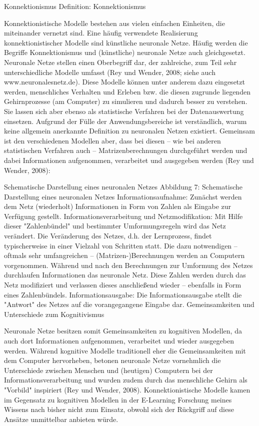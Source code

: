 \documentclass[a4paper, 12pt, twoside, BCOR=20mm, DIV=calc, abstracton, parskip=half*, toc=bibliography, toc=listof, headsepline, footsepline, headings=small, numbers=enddot]{scrreprt}
\begin{document}
Konnektionismus
Definition: Konnektionismus

Konnektionistische Modelle bestehen aus vielen einfachen Einheiten, die miteinander vernetzt sind. Eine häufig verwendete Realisierung konnektionistischer Modelle sind künstliche neuronale Netze. Häufig werden die Begriffe Konnektionismus und (künstliche) neuronale Netze auch gleichgesetzt. Neuronale Netze stellen einen Oberbegriff dar, der zahlreiche, zum Teil sehr unterschiedliche Modelle umfasst (Rey und Wender, 2008; siehe auch www.neuronalesnetz.de). Diese Modelle können unter anderem dazu eingesetzt werden, menschliches Verhalten und Erleben bzw. die diesen zugrunde liegenden Gehirnprozesse (am Computer) zu simulieren und dadurch besser zu verstehen. Sie lassen sich aber ebenso als statistische Verfahren bei der Datenauswertung einsetzen. Aufgrund der Fülle der Anwendungsbereiche ist verständlich, warum keine allgemein anerkannte Definition zu neuronalen Netzen existiert. Gemeinsam ist den verschiedenen Modellen aber, dass bei diesen – wie bei anderen statistischen Verfahren auch – Matrizenberechnungen durchgeführt werden und dabei Informationen aufgenommen, verarbeitet und ausgegeben werden (Rey und Wender, 2008):

Schematische Darstellung eines neuronalen Netzes
Abbildung 7: Schematische Darstellung eines neuronalen Netzes
Informationsaufnahme: Zunächst werden dem Netz (wiederholt) Informationen in Form von Zahlen als Eingabe zur Verfügung gestellt.
Informationsverarbeitung und Netzmodifikation: Mit Hilfe dieser "Zahlenbündel" und bestimmter Umformungsregeln wird das Netz verändert. Die Veränderung des Netzes, d.h. der Lernprozess, findet typischerweise in einer Vielzahl von Schritten statt. Die dazu notwendigen – oftmals sehr umfangreichen – (Matrizen-)Berechnungen werden an Computern vorgenommen. Während und nach den Berechnungen zur Umformung des Netzes durchlaufen Informationen das neuronale Netz. Diese Zahlen werden durch das Netz modifiziert und verlassen dieses anschließend wieder – ebenfalls in Form eines Zahlenbündels.
Informationsausgabe: Die Informationsausgabe stellt die "Antwort" des Netzes auf die vorangegangene Eingabe dar.
Gemeinsamkeiten und Unterschiede zum Kognitivismus

Neuronale Netze besitzen somit Gemeinsamkeiten zu kognitiven Modellen, da auch dort Informationen aufgenommen, verarbeitet und wieder ausgegeben werden. Während kognitive Modelle traditionell eher die Gemeinsamkeiten mit dem Computer hervorheben, betonen neuronale Netze vornehmlich die Unterschiede zwischen Menschen und (heutigen) Computern bei der Informationsverarbeitung und wurden zudem durch das menschliche Gehirn als "Vorbild" inspiriert (Rey und Wender, 2008). Konnektionistische Modelle kamen im Gegensatz zu kognitiven Modellen in der E-Learning Forschung meines Wissens nach bisher nicht zum Einsatz, obwohl sich der Rückgriff auf diese Ansätze unmittelbar anbieten würde.
\end{document}
